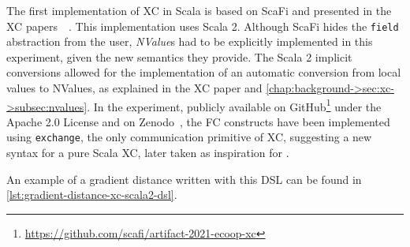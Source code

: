 The first implementation of \ac{XC} in Scala is based on ScaFi and presented in the \ac{XC} papers~\cite{xc}~\cite{xc-experiment-with-scafi}.
%
This implementation uses Scala 2.
%
Although ScaFi hides the \texttt{field} abstraction from the user, \textit{NValue}s had to be explicitly implemented in this experiment, given the new semantics they provide.
%
The Scala 2 implicit conversions allowed for the implementation of an automatic conversion from local values to NValues, as explained in the \ac{XC} paper and \cref{chap:background->sec:xc->subsec:nvalues}.
%
In the experiment, publicly available on GitHub\footnote{\url{https://github.com/scafi/artifact-2021-ecoop-xc}} under the Apache 2.0 License and on Zenodo~\cite{xc-experiment-with-scafi-code}, the \ac{FC} constructs have been implemented using \texttt{exchange}, the only communication primitive of \ac{XC}, suggesting a new syntax for a pure Scala \ac{XC}, later taken as inspiration for \this.

An example of a gradient distance written with this DSL can be found in \cref{lst:gradient-distance-xc-scala2-dsl}.


